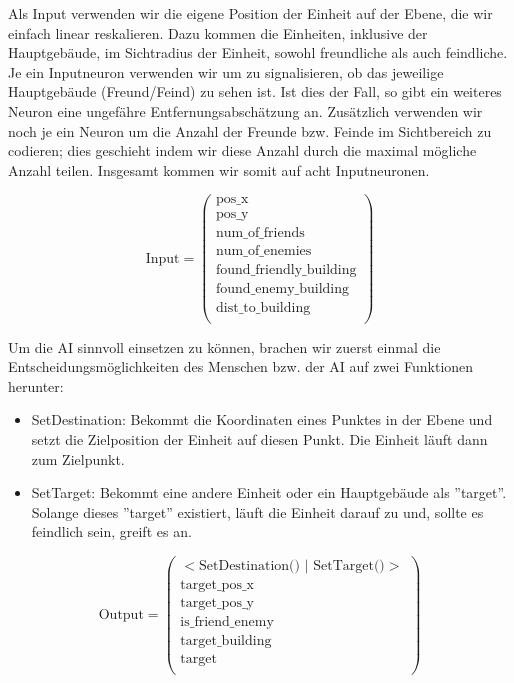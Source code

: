 \documentclass[
	12pt,
	a4paper,
	BCOR10mm,
	DIV14,
	headsepline,
	usegeometry,
]{scrreprt}
\begin{document}
Als Input verwenden wir die eigene Position der Einheit  auf der Ebene, die wir einfach linear reskalieren.
Dazu kommen die Einheiten, inklusive der Hauptgebäude, im Sichtradius der Einheit, sowohl freundliche als auch feindliche.
Je ein Inputneuron verwenden wir um zu signalisieren, ob das jeweilige Hauptgebäude (Freund/Feind) zu sehen ist.
Ist dies der Fall, so gibt ein weiteres Neuron eine ungefähre Entfernungsabschätzung an.
Zusätzlich verwenden wir noch je ein Neuron um die Anzahl der Freunde bzw. Feinde im Sichtbereich zu codieren; dies geschieht indem wir diese Anzahl durch die maximal mögliche Anzahl teilen.
Insgesamt kommen wir somit auf acht Inputneuronen.

\begin{equation}
	\text{Input} = \left( \begin{matrix}
		\text{pos\_x} \\
		\text{pos\_y} \\
	\text{num\_of\_friends} \\
		\text{num\_of\_enemies} \\
		\text{found\_friendly\_building} \\
		\text{found\_enemy\_building} \\
		\text{dist\_to\_building} \\
	\end{matrix} \right)
\end{equation}


Um die AI sinnvoll einsetzen zu können, brachen wir zuerst einmal die Entscheidungsmöglichkeiten des Menschen bzw. der AI auf zwei Funktionen herunter: 

\begin{itemize}
	\item SetDestination: Bekommt die Koordinaten eines Punktes in der Ebene und setzt die Zielposition der Einheit auf diesen Punkt.
Die Einheit läuft dann zum Zielpunkt.
	\item SetTarget: Bekommt eine andere Einheit oder ein Hauptgebäude als ''target''.
Solange dieses ''target'' existiert, läuft die Einheit darauf zu und, sollte es feindlich sein, greift es an.
\end{itemize}

\begin{equation}
	\text{Output} = \left( \begin{matrix}
		<\text{SetDestination() | SetTarget()}> \\
		\text{target\_pos\_x} \\
		\text{target\_pos\_y} \\
		\text{is\_friend\_enemy} \\
		\text{target\_building} \\
		\text{target} \\
	\end{matrix} \right)
\end{equation}
\end{document}
